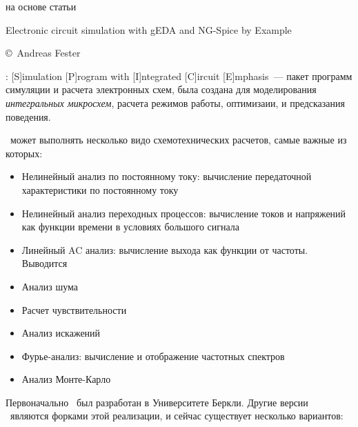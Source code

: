 \label{spice}\secdown\secdown

на основе статьи



Electronic circuit simulation with gEDA and NG-Spice by Example

\copyright\ Andreas Fester

\bigskip

\prog{\spice}: [S]imulation [P]rogram with [I]ntegrated [C]ircuit
[E]mphasis\ --- пакет программ симуляции и расчета электронных схем,
была создана для моделирования \emph{интегральных микросхем}, расчета режимов
работы, оптимизаии, и предсказания поведения.

\bigskip
\spice\ может выполнять несколько видо схемотехнических расчетов, самые важные
из которых:

\begin{itemize}
  \item
Нелинейный анализ по постоянному току: вычисление передаточной характеристики по
постоянному току
  \item 
Нелинейный анализ переходных процессов: вычисление токов и напряжений как
функции времени в условиях большого сигнала
  \item 
Линейный AC анализ: вычисление выхода как функции от частоты. Выводится
  \item 
Анализ шума 
  \item
Расчет чувствительности
  \item 
Анализ искажений 
  \item
Фурье-анализ: вычисление и отображение частотных спектров   
  \item 
Анализ Монте-Карло
\end{itemize}  

\bigskip


Первоначально \spice\ был разработан в Университете Беркли. Другие версии
\spice\ являются форками этой реализации, и сейчас существует несколько
вариантов:

